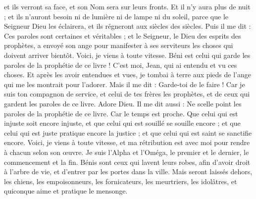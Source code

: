 \begin{multicols}{2}
et ils verront sa face, et son Nom sera sur leurs fronts.
Et il n'y aura plus de nuit ; et ils n'auront besoin ni de lumière ni de lampe ni du soleil, parce que le Seigneur Dieu les éclairera, et ils régneront aux siècles des siècles.
Puis il me dit : Ces paroles sont certaines et véritables ; et le Seigneur, le Dieu des esprits des prophètes, a envoyé son ange pour manifester à ses serviteurs les choses qui doivent arriver bientôt.
Voici, je viens à toute vitesse. Béni est celui qui garde les paroles de la prophétie de ce livre !
C'est moi, Jean, qui ai entendu et vu ces choses. Et après les avoir entendues et vues, je tombai à terre aux pieds de l'ange qui me les montrait pour l'adorer.
Mais il me dit : Garde-toi de le faire ! Car je suis ton compagnon de service, et celui de tes frères les prophètes, et de ceux qui gardent les paroles de ce livre. Adore Dieu.
Il me dit aussi : Ne scelle point les paroles de la prophétie de ce livre. Car le temps est proche.
Que celui qui est injuste soit encore injuste, et que celui qui est souillé se souille encore ; et que celui qui est juste pratique encore la justice ; et que celui qui est saint se sanctifie encore.
Voici, je viens à toute vitesse, et ma rétribution est avec moi pour rendre à chacun selon son œuvre.
Je suis l'Alpha et l'Oméga, le premier et le dernier, le commencement et la fin.
Bénis sont ceux qui lavent leurs robes, afin d'avoir droit à l'arbre de vie, et d'entrer par les portes dans la ville.
Mais seront laissés dehors, les chiens, les empoisonneurs, les fornicateurs, les meurtriers, les idolâtres, et quiconque aime et pratique le mensonge.

\end{multicols}
